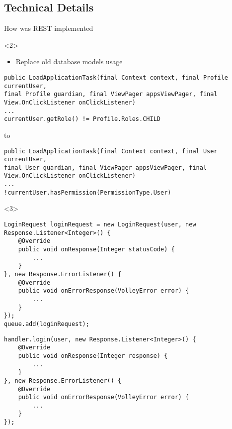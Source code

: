 \subsection{Technical Details}
\begin{frame}[fragile]{How was REST implemented}

\begin{onlyenv}<2>
\begin{itemize}
  \item Replace old database models usage
\end{itemize}
\begin{center}
\begin{minipage}[H]{0.9\linewidth}
\begin{lstlisting}
public LoadApplicationTask(final Context context, final Profile currentUser,
final Profile guardian, final ViewPager appsViewPager, final View.OnClickListener onClickListener)
...
currentUser.getRole() != Profile.Roles.CHILD 
\end{lstlisting} 

to

\begin{lstlisting}    
public LoadApplicationTask(final Context context, final User currentUser,
final User guardian, final ViewPager appsViewPager, final View.OnClickListener onClickListener)
...
!currentUser.hasPermission(PermissionType.User)
\end{lstlisting} 
\end{minipage}
\end{center}
\end{onlyenv}

\begin{onlyenv}<3>
\begin{center}
\begin{minipage}[H]{0.9\linewidth}
\begin{lstlisting}
LoginRequest loginRequest = new LoginRequest(user, new Response.Listener<Integer>() {
	@Override
    public void onResponse(Integer statusCode) {
    	...            
    }            
}, new Response.ErrorListener() {
    @Override
    public void onErrorResponse(VolleyError error) {
    	...
    }
});
queue.add(loginRequest);
\end{lstlisting} 
\begin{lstlisting}    
handler.login(user, new Response.Listener<Integer>() {
	@Override
    public void onResponse(Integer response) {
    	...
    }
}, new Response.ErrorListener() {
    @Override
    public void onErrorResponse(VolleyError error) {
    	... 
    }
});
\end{lstlisting} 
\end{minipage}
\end{center}
\end{onlyenv}
\end{frame}

